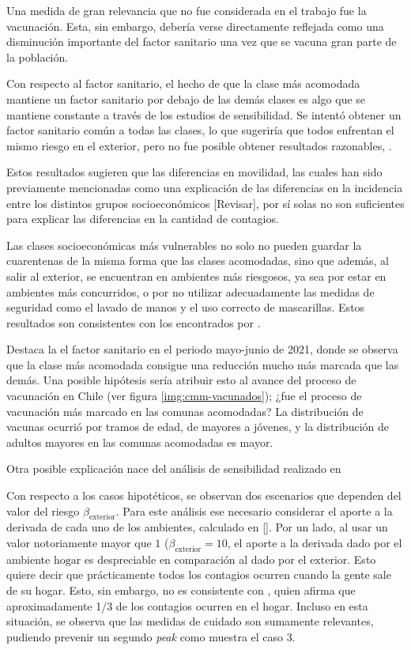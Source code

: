 Una medida de gran relevancia que no fue considerada en el trabajo fue la vacunación. Esta, sin embargo, debería verse directamente reflejada como una disminución importante del factor sanitario una vez que se vacuna gran parte de la población.

Con respecto al factor sanitario, el hecho de que la clase más acomodada mantiene un factor sanitario por debajo de las demás clases es algo que se mantiene constante a través de los estudios de sensibilidad. Se intentó obtener un factor sanitario común a todas las clases, lo que sugeriría que todos enfrentan el mismo riesgo en el exterior, pero no fue posible obtener resultados razonables, .

Estos resultados sugieren que las diferencias en movilidad, las cuales han sido previamente mencionadas como una explicación de las diferencias en la incidencia entre los distintos grupos socioeconómicos \cite{Mena2021}\cite{Gozzi2021} [Revisar], por sí solas no son suficientes para explicar las diferencias en la cantidad de contagios.

Las clases socioeconómicas más vulnerables no solo no pueden guardar la cuarentenas de la misma forma que las clases acomodadas, sino que además, al salir al exterior, se encuentran en ambientes más riesgosos, ya sea por estar en ambientes más concurridos, o por no utilizar adecuadamente las medidas de seguridad como el lavado de manos y el uso correcto de mascarillas. Estos resultados son consistentes con los encontrados por \cite{Chang2021}.

Destaca la el factor sanitario en el periodo mayo-junio de 2021, donde se observa que la clase más acomodada consigue una reducción mucho más marcada que las demás. Una posible hipótesis sería atribuir esto al avance del proceso de vacunación en Chile (ver figura \ref{img:cmm-vacunados}); ¿fue el proceso de vacunación más marcado en las comunas acomodadas? La distribución de vacunas ocurrió por tramos de edad, de mayores a jóvenes, y la distribución de adultos mayores en las comunas acomodadas es mayor.

Otra posible explicación nace del análisis de sensibilidad realizado en 

Con respecto a los casos hipotéticos, se observan dos escenarios que dependen del valor del riesgo \(\beta_{\text{exterior}}\). Para este análisis ese necesario considerar el aporte a la derivada de cada uno de los ambientes, calculado en \ref{}. 
Por un lado, al usar un valor notoriamente mayor que \(1\) (\(\beta_{\text{exterior}} = 10\), el aporte a la derivada dado por el ambiente \(\text{hogar}\) es despreciable en comparación al dado por el \(\text{exterior}\). Esto quiere decir que prácticamente todos los contagios ocurren cuando la gente sale de su hogar. Esto, sin embargo, no es consistente con \cite{Ferguson2020}, quien afirma que aproximadamente 1/3 de los contagios ocurren en el hogar. Incluso en esta situación, se observa que las medidas de cuidado son sumamente relevantes, pudiendo prevenir un segundo \textit{peak} como muestra el caso 3.

